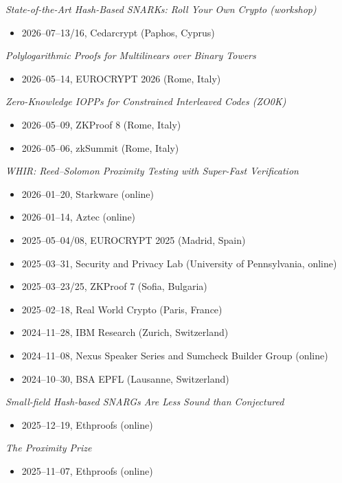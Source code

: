 \documentclass[11pt,a4paper]{article}
\begin{document}
\emph{State-of-the-Art Hash-Based SNARKs: Roll Your Own Crypto (workshop)}
\begin{itemize}[leftmargin=2em]
  \item 2026--07--13/16, Cedarcrypt (Paphos, Cyprus)
\end{itemize}

\emph{Polylogarithmic Proofs for Multilinears over Binary Towers}
\begin{itemize}[leftmargin=2em]
  \item 2026--05--14, EUROCRYPT 2026 (Rome, Italy)
\end{itemize}

\emph{Zero-Knowledge IOPPs for Constrained Interleaved Codes (ZO0K)}
\begin{itemize}[leftmargin=2em]
  \item 2026--05--09, ZKProof 8 (Rome, Italy)
  \item 2026--05--06, zkSummit (Rome, Italy)
\end{itemize}

\emph{WHIR: Reed--Solomon Proximity Testing with Super-Fast Verification}
\begin{itemize}[leftmargin=2em]
  \item 2026--01--20, Starkware (online)
  \item 2026--01--14, Aztec (online)
  \item 2025--05--04/08, EUROCRYPT 2025 (Madrid, Spain)
  \item 2025--03--31, Security and Privacy Lab (University of Pennsylvania, online)
  \item 2025--03--23/25, ZKProof 7 (Sofia, Bulgaria)
  \item 2025--02--18, Real World Crypto (Paris, France)
  \item 2024--11--28, IBM Research (Zurich, Switzerland)
  \item 2024--11--08, Nexus Speaker Series and Sumcheck Builder Group (online)
  \item 2024--10--30, BSA EPFL (Lausanne, Switzerland)
\end{itemize}

\emph{Small-field Hash-based SNARGs Are Less Sound than Conjectured}
\begin{itemize}[leftmargin=2em]
  \item 2025--12--19, Ethproofs (online)
\end{itemize}

\emph{The Proximity Prize}
\begin{itemize}[leftmargin=2em]
  \item 2025--11--07, Ethproofs (online)
\end{itemize}
\end{document}
